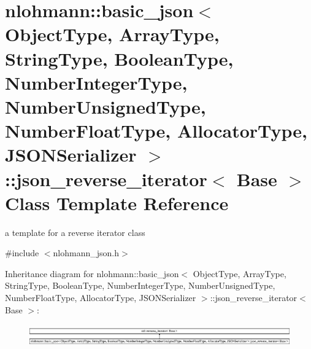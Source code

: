 \hypertarget{classnlohmann_1_1basic__json_1_1json__reverse__iterator}{}\section{nlohmann\+:\+:basic\+\_\+json$<$ Object\+Type, Array\+Type, String\+Type, Boolean\+Type, Number\+Integer\+Type, Number\+Unsigned\+Type, Number\+Float\+Type, Allocator\+Type, J\+S\+O\+N\+Serializer $>$\+:\+:json\+\_\+reverse\+\_\+iterator$<$ Base $>$ Class Template Reference}
\label{classnlohmann_1_1basic__json_1_1json__reverse__iterator}


a template for a reverse iterator class  




{\ttfamily \#include $<$nlohmann\+\_\+json.\+h$>$}

Inheritance diagram for nlohmann\+:\+:basic\+\_\+json$<$ Object\+Type, Array\+Type, String\+Type, Boolean\+Type, Number\+Integer\+Type, Number\+Unsigned\+Type, Number\+Float\+Type, Allocator\+Type, J\+S\+O\+N\+Serializer $>$\+:\+:json\+\_\+reverse\+\_\+iterator$<$ Base $>$\+:\begin{figure}[H]
\begin{center}
\leavevmode
\includegraphics[height=0.950764cm]{d1/d8e/classnlohmann_1_1basic__json_1_1json__reverse__iterator}
\end{center}
\end{figure}
